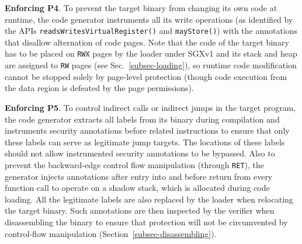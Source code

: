 \vspace{3pt}\noindent\textbf{Enforcing P4}. To prevent the target binary from changing its own code at runtime, the code generator instruments all its write operations (as identified by the APIs \verb|readsWritesVirtualRegister()| and \verb|mayStore()|) with the annotations that disallow alternation of code pages. Note that the code of the target binary has to be placed on \texttt{RWX} pages by the loader under SGXv1 and its stack and heap are assigned to \texttt{RW} pages (see Sec.~\ref{subsec-loading}), so runtime code modification cannot be stopped solely by page-level protection (though code execution from the data region is defeated by the page permissions). 


\vspace{3pt}\noindent\textbf{Enforcing P5}. To control indirect calls or indirect jumps in the target program, the code generator extracts all labels from its binary during compilation and instruments security annotations before related instructions to ensure that only these labels can serve as legitimate jump targets. The locations of these labels should not allow instrumented security annotations to be bypassed. 
Also to prevent the backward-edge control flow manipulation (through \texttt{RET}), the generator injects annotations after entry into and before return from every function call to operate on a shadow stack, which is allocated during code loading. All the legitimate labels are also replaced by the loader when relocating the target binary. Such annotations are then inspected by the verifier when disassembling the binary to ensure that protection will not be circumvented by control-flow manipulation (Section~\ref{subsec-disassembling}).  





